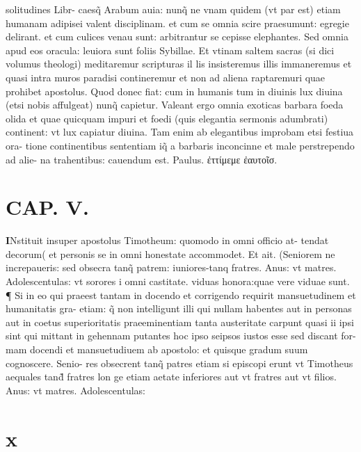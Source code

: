 \documentclass{article}
\begin{document}
\begin{pages}
solitudines Libr- caesq̃ Arabum auia: nunq̃ ne vnam quidem (vt par est) etiam humanam adipisei valent disciplinam. et cum se omnia scire praesumunt: egregie delirant. et cum culices venau sunt: arbitrantur se cepisse elephantes. Sed omnia apud eos oracula: leuiora sunt foliis Sybillae. Et vtinam saltem sacras (si dici volumus theologi) meditaremur scripturas il lis insisteremus illis immaneremus et quasi intra muros paradisi contineremur et non ad aliena raptaremuri quae prohibet apostolus. Quod donec fiat: cum in humanis tum in diuinis lux diuina (etsi nobis affulgeat) nunq̃ capietur. Valeant ergo omnia exoticas barbara foeda olida et quae quicquam impuri et foedi (quis elegantia sermonis adumbrati) continent: vt lux capiatur diuina. Tam enim ab elegantibus improbam etsi festiua ora- tione continentibus sententiam iq̃ a barbaris inconcinne et male perstrependo ad alie- na trahentibus: cauendum est. Paulus. ἐττίμεμε ἐαυτοῖσ.  \pend
\endnumbering\beginnumbering\section{CAP. V.}\pstart \huge\textbf{I}\normalsize Nstituit insuper apostolus Timotheum: quomodo in omni officio at- tendat decorum( et personis se in omni honestate accommodet. Et ait. (Seniorem ne increpaueris: sed obsecra tanq̃ patrem: iuniores-tanq fratres. Anus: vt matres. Adolescentulas: vt sorores i omni castitate. viduas honora:quae vere viduae sunt. ¶ Si in eo qui praeest tantam in docendo et corrigendo requirit mansuetudinem et humanitatis gra- etiam: q̃ non intelligunt illi qui nullam habentes aut in personas aut in coetus superioritatis praeeminentiam tanta austeritate carpunt quasi ii ipsi sint qui mittant in gehennam putantes hoc ipso seipsos iustos esse sed discant for- mam docendi et mansuetudiuem ab apostolo: et quisque gradum suum cognoscere. Senio- res obsecrent tanq̃ patres etiam si episcopi erunt vt Timotheus aequales tand̃ fratres lon ge etiam aetate inferiores aut vt fratres aut vt filios. Anus: vt matres. Adolescentulas:  \pend
\section*{x }

\end{pages}
\end{document}
